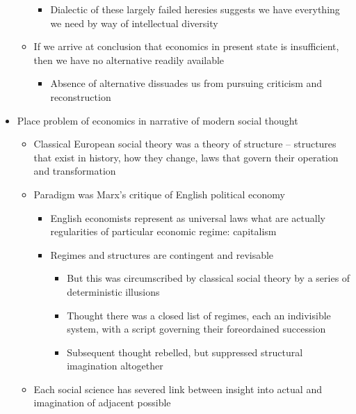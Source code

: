 \begin{itemize}
\begin{itemize}
    \begin{itemize}
    \tightlist
    \item
      Dialectic of these largely failed heresies suggests we have
      everything we need by way of intellectual diversity
    \end{itemize}
  \item
    If we arrive at conclusion that economics in present state is
    insufficient, then we have no alternative readily available

    \begin{itemize}
    \tightlist
    \item
      Absence of alternative dissuades us from pursuing criticism and
      reconstruction
    \end{itemize}
  \end{itemize}
\item
  Place problem of economics in narrative of modern social thought

  \begin{itemize}
  \tightlist
  \item
    Classical European social theory was a theory of structure --
    structures that exist in history, how they change, laws that govern
    their operation and transformation
  \item
    Paradigm was Marx's critique of English political economy

    \begin{itemize}
    \tightlist
    \item
      English economists represent as universal laws what are actually
      regularities of particular economic regime: capitalism
    \item
      Regimes and structures are contingent and revisable

      \begin{itemize}
      \tightlist
      \item
        But this was circumscribed by classical social theory by a
        series of deterministic illusions
      \item
        Thought there was a closed list of regimes, each an indivisible
        system, with a script governing their foreordained succession
      \item
        Subsequent thought rebelled, but suppressed structural
        imagination altogether
      \end{itemize}
    \end{itemize}
  \item
    Each social science has severed link between insight into actual and
    imagination of adjacent possible


\end{itemize}
\end{itemize}
